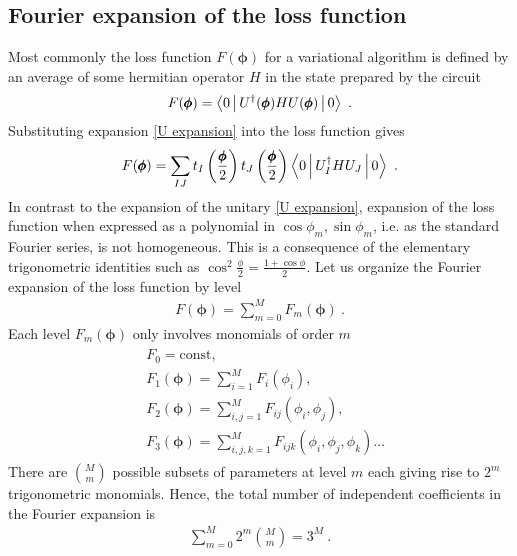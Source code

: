 \documentclass[twocolumn, amsfonts, amssymb, aps, nofootinbib]{revtex4-2}
\begin{document}
\subsection{Fourier expansion of the loss function}
Most commonly the loss function $F(\pmb\phi)$ for a variational algorithm is defined by an average of some hermitian operator $H$ in the state prepared by the circuit 
\begin{align}
	F(\pmb{\phi})=\Braket{0|U^\dagger(\pmb\phi)HU(\pmb\phi)|0} \ .
\end{align}
Substituting expansion \eqref{U expansion} into the loss function gives
\begin{align}
	F(\pmb{\phi})=\sum_{IJ}t_I\left(\frac{\pmb \phi}{2}\right)t_J\left(\frac{\pmb \phi}{2}\right)\Braket{0|U^\dagger_IHU_J|0} \ . \label{F exp}
\end{align}
In contrast to the expansion of the unitary \eqref{U expansion}, expansion of the loss function when expressed as a polynomial in $\cos\phi_m,\sin\phi_m$, i.e. as the standard Fourier series, is not homogeneous. This is a consequence of the elementary trigonometric identities such as $\cos^2\frac\phi2=\frac{1+\cos\phi}{2}$. Let us organize the Fourier expansion of the loss function by level
\begin{align}
	F(\pmb\phi)=\sum_{m=0}^M F_m(\pmb\phi) \ .
\end{align}
Each level $F_m(\pmb\phi)$ only involves monomials of order $m$
\begin{align}
\begin{split}
	&F_0=\text{const},\\
	&F_1(\pmb\phi)=\sum_{i=1}^M F_i(\phi_i),\\
	&F_2(\pmb\phi)=\sum_{i,j=1}^M F_{ij}(\phi_i,\phi_j),\\
	&F_3(\pmb\phi)=\sum_{i,j,k=1}^M F_{ijk}(\phi_i,\phi_j, \phi_k)\dots
\end{split}
\end{align}
There are $\binom{M}{m}$ possible subsets of parameters at level $m$ each giving rise to $2^m$ trigonometric monomials. Hence, the total number of independent coefficients in the Fourier expansion is
\begin{align}
	\sum_{m=0}^M 2^{m}\binom{M}{m}=3^M \label{3M coeffs} \ .
\end{align}
\end{document}
